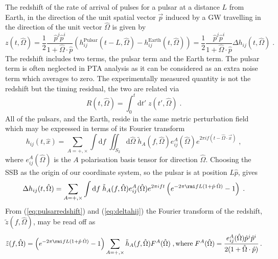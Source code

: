The redshift of the rate of arrival of pulses for a pulsar at a distance $L$ from Earth, in the direction of the unit spatial vector $\vec{p}$ induced by a GW travelling in the direction of the unit vector $\hat{\Omega}$ is given by \citep{anholm-2009}
\begin{equation}\label{eq:pulsarredshift} z(t,\hat{\Omega})=\frac{1}{2}\frac{\hat{p}^{j}\hat{p}^{i}} {1+\hat{\Omega}\cdot\hat{p}}\left(h_{ij}^{\mathrm{Pulsar}}(t-L,\hat{\Omega} )-h_{ij}^{\mathrm{Earth}}(t,\hat{\Omega} )\right)=\frac{1}{2}\frac{\hat{p}^{j}\hat{p}^{i}} {1+\hat{\Omega}\cdot\hat{p}}\Delta h_{ij}(t,\hat{\Omega})\; . \end{equation}
The redshift includes two terms, the pulsar term and the Earth term. The pulsar term is often neglected in PTA analysis as it can be considered as an extra noise term which averages to zero. The experimentally measured quantity is not the redshift but the timing residual, the two are related via
\begin{equation}\label{eq:restored}  R(t,\hat{\Omega})=\int_{0}^{t}\mathrm{d}t'\;z(t',\hat{\Omega}) \; . \end{equation}
All of the pulsars, and the Earth, reside in the same metric perturbation field which may be expressed in terms of its Fourier transform
\begin{equation} h_{ij}(t,\hat{x})=\sum_{A=+,\times}\int\mathrm{d}f\;\iint_{S_{2}}\mathrm{d}\hat{\Omega}\; \tilde{h}_{A}(f,\hat{\Omega})e_{ij}^{A}(\hat{\Omega})e^{ 2\pi i f (t-\hat{\Omega}\cdot\vec{x}) } \; ,\end{equation}
where $e^{A}_{ij}(\hat{\Omega})$ is the $A$ polarisation basis tensor for direction $\hat{\Omega}$. Choosing the SSB as the origin of our coordinate system, so the pulsar is at position $L\hat{p}$, gives
\begin{equation}\label{eq:deltahij} \Delta h_{ij}(t,\hat{\Omega})=\sum_{A=+,\times}\int\mathrm{d}f\; \tilde{h}_{A}(f,\hat{\Omega})e_{ij}^{A}(\hat{\Omega})e^{ 2\pi i f t }\left(e^{-2\pi\rmi fL (1+\hat{p}\cdot\hat{\Omega})}-1\right) \; . \end{equation}
From (\ref{eq:pulsarredshift}) and (\ref{eq:deltahij}) the Fourier transform of the redshift, $\tilde{z}(f,\hat{\Omega})$, may be read off as
\begin{equation}\label{eq:45} \tilde{z}(f,\hat{\Omega})=\left(e^{-2\pi\rmi fL (1+\hat{p}\cdot\hat{\Omega})}-1\right)\sum_{A=+,\times} \tilde{h}_{A}(f,\hat{\Omega})F^{A}(\hat{\Omega})\;, \mathrm{where}\; F^{A}(\hat{\Omega})=\frac{e_{ij}^{A}(\hat{\Omega})\hat{p}^{j}\hat{p}^{i}} {2(1+\hat{\Omega}\cdot\hat{p})} \, .\end{equation}
